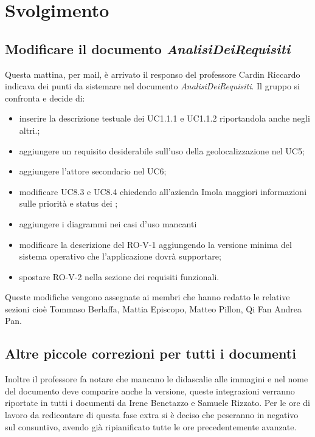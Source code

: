 \section{Svolgimento}
\subsection{Modificare il documento \emph{AnalisiDeiRequisiti}}
Questa mattina, per mail, è arrivato il responso del professore Cardin Riccardo indicava dei punti da sistemare nel documento \emph{AnalisiDeiRequisiti}.
Il gruppo si confronta e decide di:
    \begin{itemize}
        \item inserire la descrizione testuale dei UC1.1.1 e UC1.1.2 riportandola anche negli altri.;
        \item aggiungere un requisito desiderabile sull'uso della geolocalizzazione nel UC5;
        \item aggiungere l'attore secondario nel UC6;
        \item modificare UC8.3 e UC8.4 chiedendo all'azienda Imola maggiori informazioni sulle priorità e status dei ;
        \item aggiungere i diagrammi nei casi d'uso mancanti
        \item modificare la descrizione del RO-V-1 aggiungendo la versione minima del sistema operativo che l'applicazione dovrà supportare;
        \item spostare RO-V-2 nella sezione dei requisiti funzionali.
    \end{itemize}
Queste modifiche vengono assegnate ai membri che hanno redatto le relative sezioni cioè Tommaso Berlaffa, Mattia Episcopo, Matteo Pillon, Qi Fan Andrea Pan. 
\subsection{Altre piccole correzioni per tutti i documenti}
Inoltre il professore fa notare che mancano le didascalie alle immagini e nel nome del documento deve comparire anche la versione, queste integrazioni verranno riportate in tutti i documenti da Irene Benetazzo e Samuele Rizzato.
Per le ore di lavoro da redicontare di questa fase extra si è deciso che peseranno in negativo sul consuntivo, avendo già ripianificato tutte le ore precedentemente avanzate.